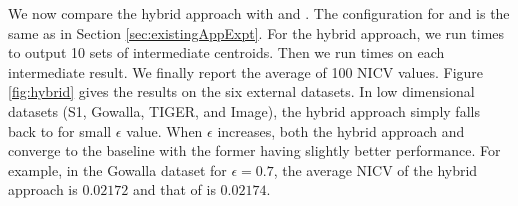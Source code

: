 \begin{comment}
	\begin{center}
	\texttt{[image: figures/vldb/synthe-plugin-true/legend-cropped.eps]}
	\end{center}
	\caption{Effects of the number of dimensions and the number of clusters}\label{fig:synthe}
\end{figure*}



\begin{figure*}[!htb]
	\begin{tabular}{ccc}
	\texttt{[image: figures/vldb/synthe-plugin-true/dplloyd\_med.eps]} & \hspace{-0.5cm}
	\texttt{[image: figures/vldb/synthe-plugin-true/dplloyd\_min.eps]} & \hspace{-0.5cm}
	\texttt{[image: figures/vldb/synthe-plugin-true/eugkm\_nicv.eps]}\\
	\hspace{-0.5cm}(a) DPLloyd-Median & \hspace{-0.5cm}(b) DPLloyd-Best  & \hspace{-0.5cm}(c) EUGkM
	\end{tabular}

	\begin{tabular}{ccc}
	\texttt{[image: figures/vldb/synthe-plugin-true/hybrid\_med.eps]} & \hspace{-0.5cm}
	\texttt{[image: figures/vldb/synthe-plugin-true/pgkm.eps]}  & \hspace{-0.5cm}
	\texttt{[image: figures/vldb/gupt/synthe\_eps\_1.0.eps]}\\
	\hspace{-0.5cm} (d) Hybrid & \hspace{-0.5cm} (e) PGkM & \hspace{-0.5cm} (f) GkM
	\end{tabular}


	\caption{Effects of the number of dimensions and the number of clusters, Heatmap}\label{fig:synthe-heatmap}
\end{figure*}

\end{comment}

We now compare the hybrid approach with \eugkm and \dpl. The configuration for \eugkm and \dpl is the same as in Section \ref{sec:existingAppExpt}.  For the hybrid approach, we run  times to output 10 sets of intermediate centroids.  Then we run  times on each intermediate result.  We finally report the average of 100 NICV values. Figure \ref{fig:hybrid} gives the results on the six external datasets. In low dimensional datasets (S1, Gowalla, TIGER, and Image), the hybrid approach simply falls back to \eugkm for small $\epsilon$ value. When $\epsilon$ increases, both the hybrid approach and \eugkm converge to the baseline with the former having slightly better performance. For example, in the Gowalla dataset for $\epsilon=0.7$, the average NICV of the hybrid approach is $0.02172$ and that of \eugkm is $0.02174$.


